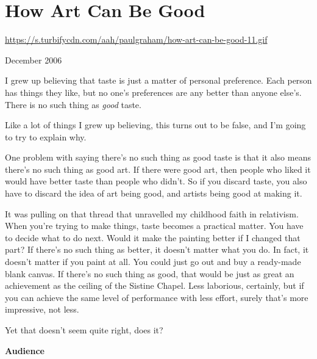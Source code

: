 \chapter{How Art Can Be Good}


            
              
                \href{https://s.turbifycdn.com/aah/paulgraham/how-art-can-be-good-11.gif}{https://s.turbifycdn.com/aah/paulgraham/how-art-can-be-good-11.gif}



December 2006

I grew up believing that taste is
                  just a matter of personal preference. Each person has things
                  they like, but no one's preferences are any better than anyone
                  else's. There is no such thing as
                  \emph{good} taste.

Like a lot of things I grew up
                  believing, this turns out to be false, and I'm going to try to
                  explain why.

One problem with saying there's no
                  such thing as good taste is that it also means there's no such
                  thing as good art. If there were good art, then people who
                  liked it would have better taste than people who didn't. So if
                  you discard taste, you also have to discard the idea of art
                  being good, and artists being good at making it.

It
                  was pulling on that thread that unravelled my childhood faith
                  in relativism. When you're trying to make things, taste
                  becomes a practical matter. You have to decide what to do
                  next. Would it make the painting better if I changed that
                  part? If there's no such thing as better, it doesn't matter
                  what you do. In fact, it doesn't matter if you paint at all.
                  You could just go out and buy a ready-made blank canvas. If
                  there's no such thing as good, that would be just as great an
                  achievement as the ceiling of the Sistine Chapel. Less
                  laborious, certainly, but if you can achieve the same level of
                  performance with less effort, surely that's more impressive,
                  not less.

Yet that doesn't seem quite right, does
                  it?

\textbf{Audience}

